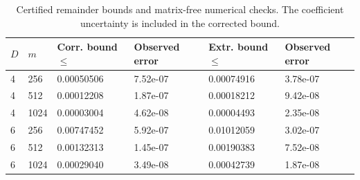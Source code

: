 \begin{table}[htbp]
\centering
\caption{Certified remainder bounds and matrix-free numerical checks. The coefficient uncertainty is included in the corrected bound.}
\label{tab:boundary_remainders}
\begin{tabular}{llllll}
\toprule
$D$ & $m$ & Corr. bound $\leq$ & Observed error & Extr. bound $\leq$ & Observed error \\
\midrule
4 & 256 & 0.00050506 & 7.52e-07 & 0.00074916 & 3.78e-07 \\
4 & 512 & 0.00012208 & 1.87e-07 & 0.00018212 & 9.42e-08 \\
4 & 1024 & 0.00003004 & 4.62e-08 & 0.00004493 & 2.35e-08 \\
6 & 256 & 0.00747452 & 5.92e-07 & 0.01012059 & 3.02e-07 \\
6 & 512 & 0.00132313 & 1.45e-07 & 0.00190383 & 7.52e-08 \\
6 & 1024 & 0.00029040 & 3.49e-08 & 0.00042739 & 1.87e-08 \\
\bottomrule
\end{tabular}
\end{table}
